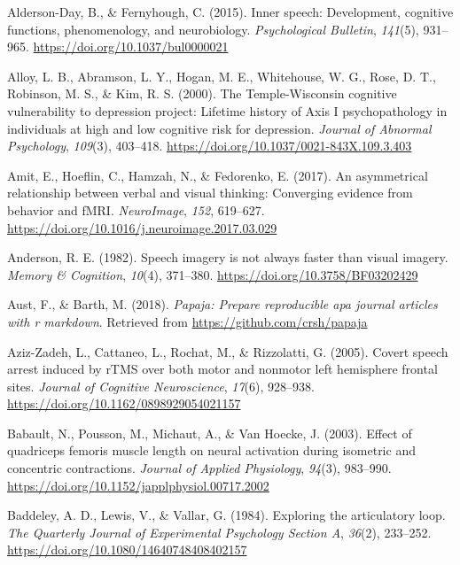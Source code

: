 \documentclass[a4paper,12pt,twoside,onecolumn,openright,final,oldfontcommands]{memoir}
\begin{document}
\leavevmode\hypertarget{ref-alderson-day_inner_2015}{}%
Alderson-Day, B., \& Fernyhough, C. (2015). Inner speech: Development, cognitive functions, phenomenology, and neurobiology. \emph{Psychological Bulletin}, \emph{141}(5), 931--965. \url{https://doi.org/10.1037/bul0000021}

\leavevmode\hypertarget{ref-alloy_temple-wisconsin_2000}{}%
Alloy, L. B., Abramson, L. Y., Hogan, M. E., Whitehouse, W. G., Rose, D. T., Robinson, M. S., \& Kim, R. S. (2000). The Temple-Wisconsin cognitive vulnerability to depression project: Lifetime history of Axis I psychopathology in individuals at high and low cognitive risk for depression. \emph{Journal of Abnormal Psychology}, \emph{109}(3), 403--418. \url{https://doi.org/10.1037/0021-843X.109.3.403}

\leavevmode\hypertarget{ref-amit_asymmetrical_2017}{}%
Amit, E., Hoeflin, C., Hamzah, N., \& Fedorenko, E. (2017). An asymmetrical relationship between verbal and visual thinking: Converging evidence from behavior and fMRI. \emph{NeuroImage}, \emph{152}, 619--627. \url{https://doi.org/10.1016/j.neuroimage.2017.03.029}

\leavevmode\hypertarget{ref-anderson_speech_1982}{}%
Anderson, R. E. (1982). Speech imagery is not always faster than visual imagery. \emph{Memory \& Cognition}, \emph{10}(4), 371--380. \url{https://doi.org/10.3758/BF03202429}

\leavevmode\hypertarget{ref-R-papaja}{}%
Aust, F., \& Barth, M. (2018). \emph{Papaja: Prepare reproducible apa journal articles with r markdown}. Retrieved from \url{https://github.com/crsh/papaja}

\leavevmode\hypertarget{ref-Aziz-Zadeh2005}{}%
Aziz-Zadeh, L., Cattaneo, L., Rochat, M., \& Rizzolatti, G. (2005). Covert speech arrest induced by rTMS over both motor and nonmotor left hemisphere frontal sites. \emph{Journal of Cognitive Neuroscience}, \emph{17}(6), 928--938. \url{https://doi.org/10.1162/0898929054021157}

\leavevmode\hypertarget{ref-babault_effect_2003}{}%
Babault, N., Pousson, M., Michaut, A., \& Van Hoecke, J. (2003). Effect of quadriceps femoris muscle length on neural activation during isometric and concentric contractions. \emph{Journal of Applied Physiology}, \emph{94}(3), 983--990. \url{https://doi.org/10.1152/japplphysiol.00717.2002}

\leavevmode\hypertarget{ref-baddeley_exploring_1984}{}%
Baddeley, A. D., Lewis, V., \& Vallar, G. (1984). Exploring the articulatory loop. \emph{The Quarterly Journal of Experimental Psychology Section A}, \emph{36}(2), 233--252. \url{https://doi.org/10.1080/14640748408402157}
\end{document}
